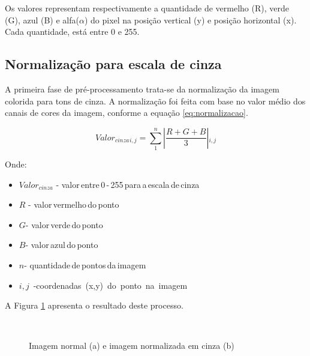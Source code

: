 \documentclass[12pt]{article}
\begin{document}
Os valores representam respectivamente a quantidade de vermelho (R), verde (G), azul (B) e alfa($\alpha$) do pixel na posição vertical (y) e posição horizontal (x). Cada quantidade, está entre 0 e 255.

\subsection{Normalização para escala de cinza}

A primeira fase de pré-processamento trata-se da normalização da imagem colorida para tons de cinza. A normalização foi feita com base no valor médio dos canais de cores da imagem, conforme a equação \ref{eq:normalizacao}.

\begin{equation} \label{eq:normalizacao}
Valor{_{cinza}}{_{i, j}}= \sum_{1}^{n} \left |\frac{R + G + B}{3}\right |{_{i, j}}
\end{equation}


Onde:

\begin{itemize}  
  \item $Valor{_{cinza}}$ -\; valor\,entre\,0\,-\,255\,para\,a\,escala\,de\,cinza
  \item $R $ -\; valor\,vermelho\,do\,ponto
  \item $G $-\; valor\,verde\,do\,ponto
  \item $B $-\; valor\,azul\,do\,ponto
  \item $n $-\; quantidade\,de\,pontos\,da\,imagem
  \item $i, j$ \,-\;coordenadas\, (x,y)\, do\, ponto\, na\, imagem
\end{itemize}

A Figura \ref{fig2} apresenta o resultado deste processo.

\begin{figure}[H]
\centering
\mbox{\quad
{}}
\caption{Imagem normal (a) e imagem normalizada em cinza (b)} \label{fig2}
\end{figure}
\end{document}
